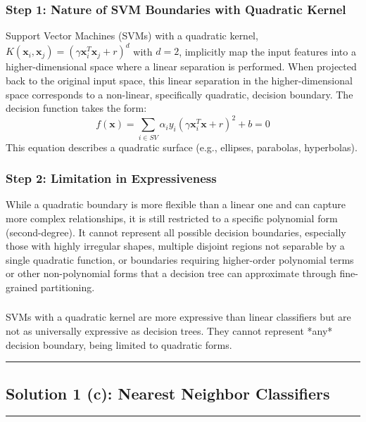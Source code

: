 \documentclass{article}
\begin{document}
\subsubsection*{Step 1: Nature of SVM Boundaries with Quadratic Kernel}
\parbox{\textwidth}{
Support Vector Machines (SVMs) with a quadratic kernel, $K(\mathbf{x}_i, \mathbf{x}_j) = (\gamma \mathbf{x}_i^T \mathbf{x}_j + r)^d$ with $d=2$, implicitly map the input features into a higher-dimensional space where a linear separation is performed. When projected back to the original input space, this linear separation in the higher-dimensional space corresponds to a non-linear, specifically quadratic, decision boundary. The decision function takes the form:
$$ f(\mathbf{x}) = \sum_{i \in SV} \alpha_i y_i (\gamma \mathbf{x}_i^T \mathbf{x} + r)^2 + b = 0 $$
This equation describes a quadratic surface (e.g., ellipses, parabolas, hyperbolas).
}

\subsubsection*{Step 2: Limitation in Expressiveness}
\parbox{\textwidth}{
While a quadratic boundary is more flexible than a linear one and can capture more complex relationships, it is still restricted to a specific polynomial form (second-degree). It cannot represent all possible decision boundaries, especially those with highly irregular shapes, multiple disjoint regions not separable by a single quadratic function, or boundaries requiring higher-order polynomial terms or other non-polynomial forms that a decision tree can approximate through fine-grained partitioning.
}

\subsubsection*{}
\parbox{\textwidth}{
SVMs with a quadratic kernel are more expressive than linear classifiers but are not as universally expressive as decision trees. They cannot represent *any* decision boundary, being limited to quadratic forms.
}

\noindent\rule{\textwidth}{0.4pt}

\newpage

\subsection*{Solution 1 (c): Nearest Neighbor Classifiers}
\noindent\rule{\textwidth}{0.4pt}
\end{document}
